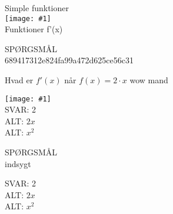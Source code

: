 \documentclass[]{article}
\newenvironment{question}[2]{SPØRGSMÅL\\}{\hspace{50px}}
\newcommand{\name}[1]{{\huge #1}\\}
\newcommand{\tag}[1]{#1}
\newcommand{\cover}[1]{\texttt{[image: \#1]}\\}
\newcommand{\image}[1]{\texttt{[image: \#1]}\\}
\newcommand{\answer}[1]{{\color{green} SVAR: #1}\\}
\newcommand{\alt}[1]{{\color{red} ALT: #1}\\}
\begin{document}
\name{Simple funktioner}
\cover{test.png}
\tag{Funktioner}
\tag{f'(x)}

\begin{question}{multi}\id{689417312e824fa99a472d625ce56c31}
    
Hvad er $f'(x)$ når $f(x)=2\cdot x$ wow mand

\image{test.png}

\answer{2}
\alt{$2x$}
\alt{$x^2$}

\end{question}

\begin{question}{multi}
    
Sindsygt

\answer{2}
\alt{$2x$}
\alt{$x^2$}

\end{question}
\end{document}
